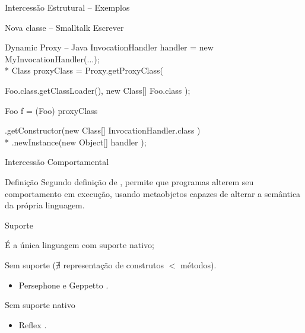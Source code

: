 \documentclass[12pt,t]{beamer}
\begin{document}
 	 \begin{frame}{Intercessão Estrutural -- Exemplos}
 	 	\begin{exampleblock}{Nova classe -- Smalltalk}
 	 		\alert{Escrever}
 	 	\end{exampleblock}
 	 	\begin{exampleblock}{Dynamic Proxy -- Java}
 	 		InvocationHandler handler = new MyInvocationHandler(...);\\*
		    Class proxyClass = Proxy.getProxyClass(
	    	\begin{adjustwidth}{2.5em}{0pt}
		        Foo.class.getClassLoader(), new Class[] { Foo.class });
	        \end{adjustwidth}
		    Foo f = (Foo) proxyClass
		    \begin{adjustwidth}{2.5em}{0pt}
		        .getConstructor(new Class[] { InvocationHandler.class }) \\*
		        .newInstance(new Object[] { handler });
	        \end{adjustwidth}
 	 	\end{exampleblock}
 	 \end{frame}
 	 \begin{frame}{Intercessão Comportamental}
 	 	\begin{block}{Definição}
 	 		Segundo definição de , permite que programas alterem seu comportamento em execução, usando metaobjetos capazes de alterar a semântica da própria linguagem.
 	 	\end{block} 	 	 	 	
 		\begin{block}{Suporte}
 			\begin{description}  [Smalltalk:] 
	 			\item [CLOS] É a única linguagem com suporte nativo;
	 			\item [Smalltalk:] Sem suporte ($\nexists$ representação de construtos $<$ métodos). 
	 			\begin{itemize}
	 				\item Persephone e Geppetto \cite{marschall2006taking,rothlisberger2006geppetto}.
	 			\end{itemize}
	 			\item [Java:] Sem suporte nativo
	 			\begin{itemize}
	 				\item Reflex \cite{tanter2001reflex}.
	 			\end{itemize}
	 		\end{description}
 	 	\end{block} 	 	 	 	
 	 \end{frame}
\end{document}
